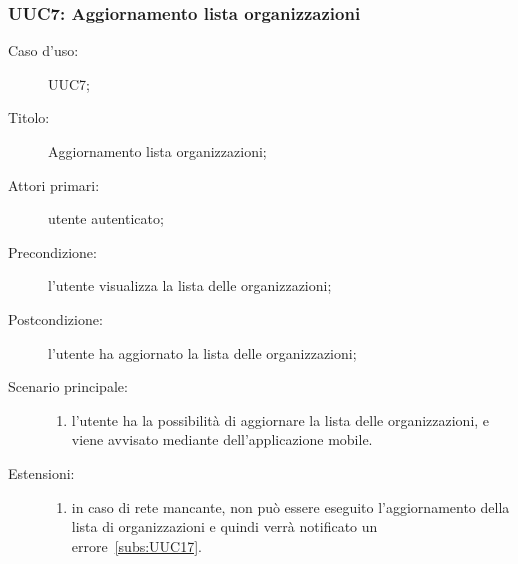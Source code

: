 \documentclass[../../../analisi-dei-requisiti.tex]{subfiles}
\begin{document}
\subsubsection{UUC7: Aggiornamento lista organizzazioni}%
\label{subs:UUC7}
\begin{description}
  \item[Caso d'uso:] UUC7;
  \item[Titolo:] Aggiornamento lista organizzazioni;
  \item[Attori primari:] utente autenticato;
  \item[Precondizione:] l'utente visualizza la lista delle organizzazioni;
  \item[Postcondizione:] l'utente ha aggiornato la lista delle organizzazioni;
  \item[Scenario principale:]
        \begin{enumerate}
          \item l'utente ha la possibilità di aggiornare la lista delle organizzazioni, e viene avvisato mediante  dell'applicazione mobile.
        \end{enumerate}
  \item[Estensioni:]
        \begin{enumerate}
          \item in caso di rete mancante, non può essere eseguito l'aggiornamento della lista di organizzazioni e quindi verrà notificato un errore~\ref{subs:UUC17}.
        \end{enumerate}
\end{description}
\end{document}
